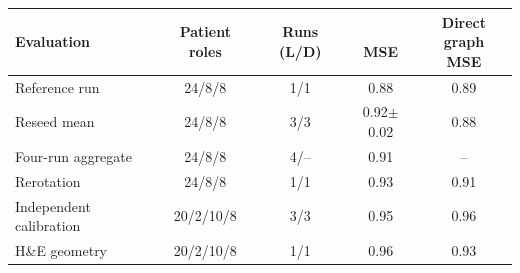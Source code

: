\begin{tabular}{@{}lcccc@{}}
\toprule
Evaluation & Patient roles & Runs (L/D) & \shortstack{\method{}\\MSE} & \shortstack{Direct graph\\MSE} \\
\midrule
Reference run & 24/8/8 & 1/1 & 0.88 & 0.89 \\
Reseed mean & 24/8/8 & 3/3 & 0.92$\pm$0.02 & 0.88 \\
Four-run aggregate & 24/8/8 & 4/-- & 0.91 & -- \\
Rerotation & 24/8/8 & 1/1 & 0.93 & 0.91 \\
Independent calibration & 20/2/10/8 & 3/3 & 0.95 & 0.96 \\
H\&E geometry & 20/2/10/8 & 1/1 & 0.96 & 0.93 \\
\bottomrule
\end{tabular}
